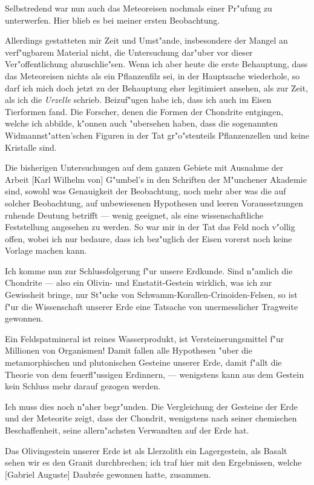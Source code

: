 \documentclass[a4paper, 11pt, oneside]{article}
\begin{document}
Selbstredend war nun auch das Meteoreisen nochmals einer Pr"ufung zu unterwerfen. Hier blieb es bei meiner ersten Beobachtung.

Allerdings gestatteten mir Zeit und Umst"ande, insbesondere der Mangel an verf"ugbarem Material nicht, die Untersuchung dar"uber vor dieser Ver"offentlichung abzuschlie"sen. Wenn ich aber heute die erste Behauptung, dass das Meteoreisen nichts als ein Pflanzenfilz sei, in der Hauptsache wiederhole, so darf ich mich doch jetzt zu der Behauptung eher legitimiert ansehen, als zur Zeit, als ich die \emph{Urzelle} schrieb. Beizuf"ugen habe ich, dass ich auch im Eisen Tierformen fand. Die Forscher, denen die Formen der Chondrite entgingen, welche ich abbilde, k"onnen auch "ubersehen haben, dass die sogenannten Widmannst"atten'schen Figuren in der Tat gr"o"stenteils Pflanzenzellen und keine Kristalle sind.

Die bisherigen Untersuchungen auf dem ganzen Gebiete mit Ausnahme der Arbeit [Karl Wilhelm von] G"umbel's in den Schriften der M"unchener Akademie sind, sowohl was Genauigkeit der Beobachtung, noch mehr aber was die auf solcher Beobachtung, auf unbewiesenen Hypothesen und leeren Voraussetzungen ruhende Deutung betrifft --- wenig geeignet, als eine wissenschaftliche Feststellung angesehen zu werden. So war mir in der Tat das Feld noch v"ollig offen, wobei ich nur bedaure, dass ich bez"uglich der Eisen vorerst noch keine Vorlage machen kann.

Ich komme nun zur Schlussfolgerung f"ur unsere Erdkunde. Sind n"amlich die Chondrite --- also ein Olivin- und Enstatit-Gestein wirklich, was ich zur Gewissheit bringe, nur St"ucke von Schwamm-Korallen-Crinoiden-Felsen, so ist f"ur die Wissenschaft unserer Erde eine Tatsache von unermesslicher Tragweite gewonnen.

Ein Feldspatmineral ist reines Wasserprodukt, ist Versteinerungsmittel f"ur Millionen von Organismen! Damit fallen alle Hypothesen "uber die metamorphischen und plutonischen Gesteine unserer Erde, damit f"allt die Theorie von dem feuerfl"ussigen Erdinnern, --- wenigstens kann aus dem Gestein kein Schluss mehr darauf gezogen werden.

Ich muss dies noch n"aher begr"unden. Die Vergleichung der Gesteine der Erde und der Meteorite zeigt, dass der Chondrit, wenigstens nach seiner chemischen Beschaffenheit, seine allern"achsten Verwandten auf der Erde hat.

Das Olivingestein unserer Erde ist als Llerzolith ein Lagergestein, als Basalt sehen wir es den Granit durchbrechen; ich traf hier mit den Ergebnissen, welche [Gabriel Auguste] Daubrée gewonnen hatte, zusammen.
\end{document}
